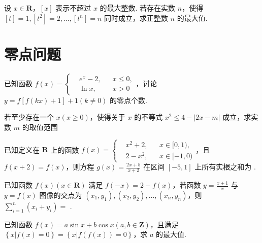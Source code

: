 \documentclass[a4paper , final]{ctexart}
\newenvironment{problem}[1]{%
  \item #1
  \par
  \vspace{8cm}
}{}
\begin{document}
\begin{problems}
    \begin{problem}
        {
            设 $x\in \mathbf{R}$，$[x]$ 表示不超过 $ x$ 的最大整数. 若存在实数 $ n$，使得$ [t] = 1 , [t^2] = 2 , \ldots , [t^n] = n$ 同时成立，求正整数 $ n$ 的最大值.
        }
    \end{problem}

\end{problems}

\newpage
\section*{零点问题}

\begin{problems}
    \begin{problem}
        {
            已知函数 $ f(x) = \left\{\begin{aligned} &e^x-2,&&x\leq 0,\\ &\ln{x} ,&&x>0\end{aligned}\right.$，讨论 $ y = f\left[f(kx)+1\right]+1(k\neq 0)$ 的零点个数.
        }
    \end{problem}

    \begin{problem}
        {
            若至少存在一个 $ x(x\geq 0)$，使得关于 $ x$ 的不等式 $x^2\leq 4-\left\vert 2x-m \right\vert$ 成立，求实数 $m$ 的取值范围
        }
    \end{problem}

    \begin{problem}
        {
            已知定义在 $\mathbf{R}$ 上的函数 $ f(x) = \left\{\begin{aligned}&x^2+2,&&x\in [0,1),\\&2-x^2,&& x\in[-1,0)\end{aligned}\right.$，且 $ f(x+2) = f(x)$，则方程 $ g(x) = \frac{2x+5}{x+2}$ 在区间 $ [-5,1]$ 上所有实根之和为 \underline{\hspace{1.5cm}}.
        }
    \end{problem}

    \begin{problem}
        {
            已知函数 $f(x)(x\in \mathbf{R})$ 满足 $ f(-x) = 2-f(x)$，若函数 $ y = \frac{x+1}{x}$ 与 $ y = f(x)$ 图像的交点为 $ (x_1,y_1),(x_2,y_2),\ldots , (x_n,y_n)$，则 $\sum_{i = 1}^n(x_i+y_i)=$ \underline{\hspace{1.5cm}}.
        }
    \end{problem}

    \begin{problem}
        {
            已知函数 $ f(x)= a\sin{x}+b\cos{x}(a,b\in \mathbf{Z})$，且满足 $ \left\{x\vert f(x)=0\right\} = \left\{x\vert f(f(x))=0\right\}$，求 $a$ 的最大值. 
        }
    \end{problem}



\end{problems}
\end{document}
